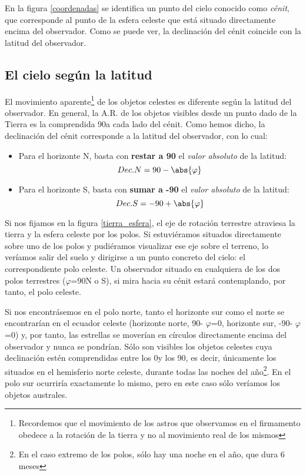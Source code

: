 \documentclass[11pt,a5paper,twoside]{amsbook}
\begin{document}
En la figura \ref{coordenadas} se identifica un punto del cielo conocido como \textit{cénit}, que corresponde al punto de la esfera celeste que está situado directamente encima del observador. Como se puede ver, la declinación del cénit coincide con la latitud del observador.

\subsection{El cielo según la latitud}

El movimiento aparente\footnote{Recordemos que el movimiento de los astros que observamos en el firmamento obedece a la rotación de la tierra y no al movimiento real de los mismos} de los objetos celestes es diferente según la latitud del observador. En general, la A.R. de los objetos visibles desde un punto dado de la Tierra es la comprendida 90\textdegree a cada lado del cénit. Como hemos dicho, la declinación del cénit corresponde a la latitud del observador, con lo cual:

\begin{itemize}
 \item Para el horizonte N, basta con \textbf{restar a 90\textdegree} el \textit{valor absoluto} de la latitud: 
 \[Dec. N = 90 - \abs{\varphi}\]
 \item Para el horizonte S, basta con \textbf{sumar a -90\textdegree} el \textit{valor absoluto} de la latitud:
 \[Dec. S = -90 + \abs{\varphi}\]
\end{itemize}


Si nos fijamos en la figura \ref{tierra_esfera}, el eje de rotación terrestre atraviesa la tierra y la esfera celeste por los polos. Si estuviéramos situados directamente sobre uno de los polos y pudiéramos visualizar ese eje sobre el terreno, lo veríamos salir del suelo y dirigirse a un punto concreto del cielo: el correspondiente polo celeste. Un observador situado en cualquiera de los dos polos terrestres ($\varphi$=90\textdegree  N o S), si mira hacia su cénit estará contemplando, por tanto, el polo celeste. 

Si nos encontrásemos en el polo norte, tanto el horizonte sur como el norte se encontrarían en el ecuador celeste (horizonte norte, 90\textdegree - $\varphi$=0\textdegree, horizonte sur, -90\textdegree - $\varphi$=0\textdegree) y, por tanto, las estrellas se moverían en círculos directamente encima del  observador y nunca se pondrían. Sólo son visibles los objetos celestes cuya declinación estén comprendidas entre los 0\textdegree y los 90\textdegree, es decir, únicamente los situados en el hemisferio norte celeste, durante todas las noches del año\footnote{En el caso extremo de los polos, sólo hay una noche en el año, que dura 6 meses}. En el polo sur ocurriría exactamente lo mismo, pero en este caso sólo veríamos los objetos australes.
\end{document}

